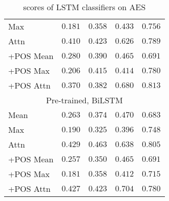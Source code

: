 \begin{table}
\begin{tabular}{lrrrr}
    Max & $0.181$ & $0.358$ & $0.433$ & $0.756$ \\
    Attn & $0.410$ & $0.423$ & $0.626$ & $0.789$ \\
    +POS Mean & $0.280$ & $0.390$ & $0.465$ & $0.691$ \\
    +POS Max & $0.206$ & $0.415$ & $0.414$ & $0.780$ \\
    +POS Attn & $0.370$ & $0.382$ & $0.680$ & $\mathbf{0.813}$ \\
    \midrule \multicolumn{5}{c}{Pre-trained, BiLSTM} \\ \midrule
    Mean & $0.263$ & $0.374$ & $0.470$ & $0.683$ \\
    Max & $0.190$ & $0.325$ & $0.396$ & $0.748$ \\
    Attn & $0.429$ & $\mathbf{0.463}$ & $0.638$ & $0.805$ \\
    +POS Mean & $0.257$ & $0.350$ & $0.465$ & $0.691$ \\
    +POS Max & $0.181$ & $0.358$ & $0.412$ & $0.715$ \\
    +POS Attn & $0.427$ & $0.423$ & $\mathbf{0.704}$ & $0.780$ \\
    \bottomrule
  \end{tabular}
  \caption{\FI scores of LSTM classifiers on AES}
  \label{tab:lstm-results}
\end{table}

